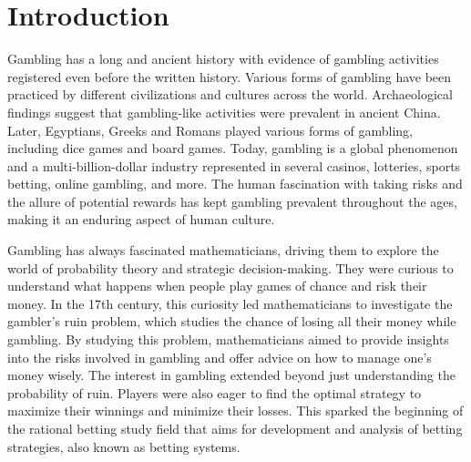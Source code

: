 \documentclass[11pt,twoside]{article}
\numberwithin{Theorem}{section}
\numberwithin{Definition}{section}
\numberwithin{Lemma}{section}
\numberwithin{Algorithm}{section}
\numberwithin{equation}{section}
\begin{document}
\clearpage

\pagestyle{plain}
\setcounter{page}{1}

\tableofcontents
\clearpage
\listoftables
\listoffigures
\listofalgorithms
\cleardoublepage

\setcounter{page}{1}

\nocite{*}

\clearpage

\section{Introduction}
\label{intro}

Gambling has a long and ancient history with evidence of gambling activities registered even before the written history. Various forms of gambling have been practiced by different civilizations and cultures across the world. Archaeological findings suggest that gambling-like activities were prevalent in ancient China. Later, Egyptians, Greeks and Romans played various forms of gambling, including dice games and board games. Today, gambling is a global phenomenon and a multi-billion-dollar industry represented in several casinos, lotteries, sports betting, online gambling, and more. The human fascination with taking risks and the allure of potential rewards has kept gambling prevalent throughout the ages, making it an enduring aspect of human culture.

Gambling has always fascinated mathematicians, driving them to explore the world of probability theory and strategic decision-making. They were curious to understand what happens when people play games of chance and risk their money. In the 17th century, this curiosity led mathematicians to investigate the gambler's ruin problem, which studies the chance of losing all their money while gambling. By studying this problem, mathematicians aimed to provide insights into the risks involved in gambling and offer advice on how to manage one's money wisely. The interest in gambling extended beyond just understanding the probability of ruin. Players were also eager to find the optimal strategy to maximize their winnings and minimize their losses. This sparked the beginning of the rational betting study field that aims for development and analysis of betting strategies, also known as betting systems. 
\end{document}
